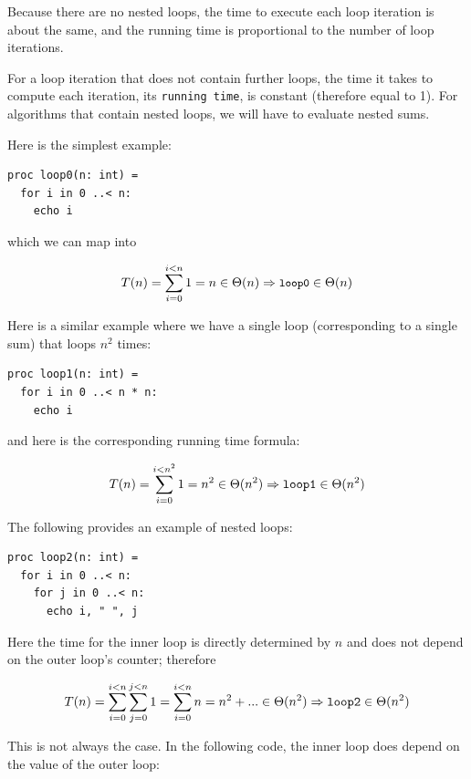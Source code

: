 \documentclass[justified, sixbynine]{tufte-book}
\def\ft{\small\tt}
\theoremstyle{plain}%
\newtheorem * {corollary}{Corollary}
\theoremstyle{definition}
\theoremstyle{remark}
\newtheorem * {remark}{Remark}
\newtheorem * {note}{Note}
\begin{document}
\begin{fullwidth}
Because there are no nested loops, the time to execute each loop iteration is about the same, and the running time is proportional to the number of loop iterations.

For a loop iteration that does not contain further loops, the time it takes to compute each iteration, its {\ft running time}, is constant (therefore equal to 1). For algorithms that contain nested loops, we will have to evaluate nested sums.

Here is the simplest example:

\begin{lstlisting}
proc loop0(n: int) =
  for i in 0 ..< n:
    echo i
\end{lstlisting}

which we can map into

\begin{equation}
T(n)=\sum_{i=0}^{i<n}1=n\in \Theta (n)\Rightarrow \text{{\ft loop0}}\in
\Theta (n)
\end{equation}

Here is a similar example where we have a single loop (corresponding to a single sum) that loops $n^2$ times:

\begin{lstlisting}
proc loop1(n: int) =
  for i in 0 ..< n * n:
    echo i
\end{lstlisting}

and here is the corresponding running time formula:

\begin{equation}
T(n)=\sum_{i=0}^{i<n^2}1=n^2\in \Theta (n^2)\Rightarrow \text{{\tt loop1}}%
\in \Theta (n^2)
\end{equation}

The following provides an example of nested loops:

\begin{lstlisting}
proc loop2(n: int) =
  for i in 0 ..< n:
    for j in 0 ..< n:
      echo i, " ", j
\end{lstlisting}

Here the time for the inner loop is directly determined by $n$ and does not depend on the outer loop's counter; therefore

\begin{equation}
T(n)=\sum_{i=0}^{i<n}\sum_{j=0}^{j<n}1=\sum_{i=0}^{i<n}n=n^2+...\in \Theta
(n^2)\Rightarrow \text{{\tt loop2}}\in \Theta (n^2)
\end{equation}

This is not always the case. In the following code, the inner loop does depend on the value of the outer loop:


\end{fullwidth}
\end{document}
